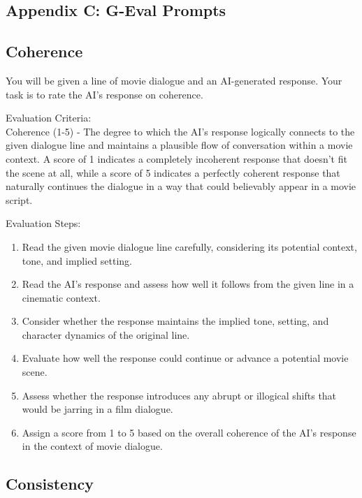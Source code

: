 \documentclass[stu,donotrepeattitle,floatsintext]{apa7}
\begin{document}
\begin{appendices}
        \section{Appendix C: G-Eval Prompts}\label{sec:g-eval-prompts}
        \subsection{Coherence}\label{subsec:g-eval-coherence}

        \noindent You will be given a line of movie dialogue and an AI-generated response.
        Your task is to rate the AI's response on coherence.

        \bigskip
        \noindent Evaluation Criteria:\\
        \noindent Coherence (1-5) - The degree to which the AI's response logically connects to the given dialogue line and maintains a plausible flow of conversation within a movie context.
        A score of 1 indicates a completely incoherent response that doesn't fit the scene at all, while a score of 5 indicates a perfectly coherent response that naturally continues the dialogue in a way that could believably appear in a movie script.

        \bigskip
        \noindent Evaluation Steps:
        \begin{enumerate}
            \item Read the given movie dialogue line carefully, considering its potential context, tone, and implied setting.
            \item Read the AI's response and assess how well it follows from the given line in a cinematic context.
            \item Consider whether the response maintains the implied tone, setting, and character dynamics of the original line.
            \item Evaluate how well the response could continue or advance a potential movie scene.
            \item Assess whether the response introduces any abrupt or illogical shifts that would be jarring in a film dialogue.
            \item Assign a score from 1 to 5 based on the overall coherence of the AI's response in the context of movie dialogue.
        \end{enumerate}

        \subsection{Consistency}\label{subsec:g-eval-consistency}


\end{appendices}
\end{document}
